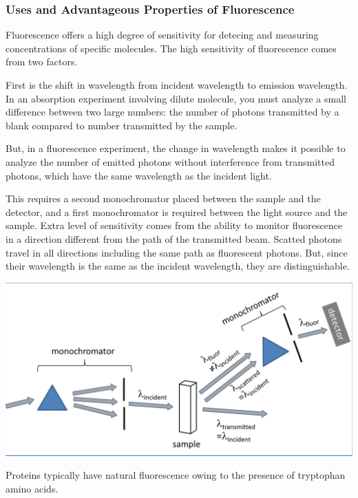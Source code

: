 \documentclass[12pt, letterpaper]{article}
\begin{document}
\subsubsection*{Uses and Advantageous Properties of Fluorescence}
Fluorescence offers a high degree of sensitivity for detecing and measuring concentrations of specific molecules. 
The high sensitivity of fluorescence comes from two factors. 

First is the shift in wavelength from incident wavelength to emission wavelength. In an absorption experiment involving 
dilute molecule, you must analyze a small difference between two large numbers: the number of photons transmitted by a blank compared to 
number transmitted by the sample. 

But, in a fluorescence experiment, the change in wavelength makes it possible to analyze the number of emitted photons without interference from 
transmitted photons, which have the same wavelength as the incident light. 

\newpage

This requires a second monochromator placed between the sample and the detector, and a first monochromator is required between the light source and the sample. 
Extra level of sensitivity comes from the ability to monitor fluorescence in a direction different from the path of the transmitted beam. Scatted photons travel in all directions
including the same path as fluorescent photons. But, since their wavelength is the same as the incident wavelength, they are distinguishable. 

\begin{center}
    \includegraphics[scale = 0.35]{fluorescence experiment.png}
\end{center}

Proteins typically have natural fluorescence owing to the presence of tryptophan amino acids. 
\end{document}
